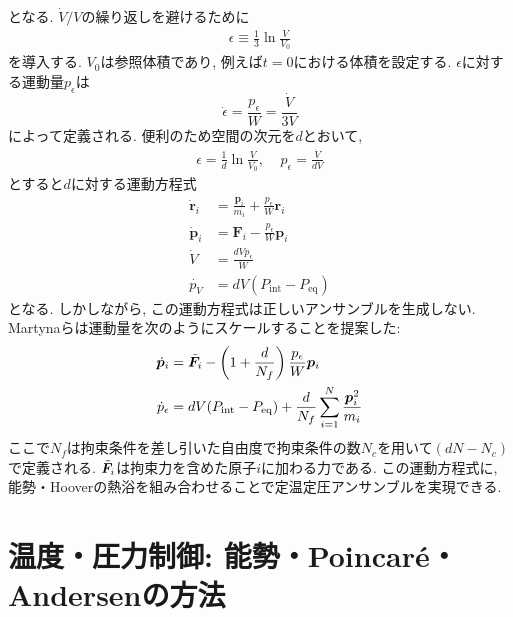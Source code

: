 となる.
$\dot{V}/V$の繰り返しを避けるために
\begin{align}
 \epsilon \equiv \frac{1}{3} \ln \frac{V}{V_{0}}
\end{align}
を導入する.
$V_{0}$は参照体積であり, 例えば$t=0$における体積を設定する.
$\epsilon$に対する運動量$p_{\epsilon}$は
\begin{equation}
 \dot{\epsilon} = \frac{p_{\epsilon}}{W} = \frac{\dot{V}}{3V}
\end{equation}
によって定義される.
便利のため空間の次元を$d$とおいて,
\begin{align}
 \epsilon     = \frac{1}{d} \ln \frac{V}{V_{0}}, ~~~~~
 p_{\epsilon} = \frac{\dot{V}}{dV}
\end{align}
とすると$d$に対する運動方程式
\begin{align}
 \dot{\bm{r}}_{i} &= \frac{\bm{p}_{i}}{m_{i}} + \frac{p_{\epsilon}}{W} \bm{r}_{i} \\
 \dot{\bm{p}}_{i} &= \bm{F}_{i} - \frac{p_{\epsilon}}{W} \bm{p}_{i} \\
 \dot{V}          &= \frac{dV p_{\epsilon}}{W} \\
 \dot{p_{V}}      &= dV (P_{\mathrm{int}} - P_{\mathrm{eq}})
\end{align}
となる.
しかしながら, この運動方程式は正しいアンサンブルを生成しない. 
Martyna\cite{1994Martyna}らは運動量を次のようにスケールすることを提案した:
\begin{align}
  \dot{\bm{p}}_{i}   &= \Tilde{\bm{F}}_{i}
                      - \left(1 + \frac{d}{N_{f}} \right) \frac{p_{\epsilon}}{W} \bm{p}_{i} \\
  \dot{p}_{\epsilon} &= dV (P_{\mathrm{int}} - P_{\mathrm{eq}})
                      + \frac{d}{N_{f}} \sum_{i=1}^{N} \frac{\bm{p}_{i}^{2}}{m_{i}}
\end{align}
ここで$N_{f}$は拘束条件を差し引いた自由度で拘束条件の数$N_{c}$を用いて$(dN - N_{c})$で定義される.
$\Tilde{\bm{F}}_{i}$は拘束力を含めた原子$i$に加わる力である.
この運動方程式に, 能勢・Hooverの熱浴を組み合わせることで定温定圧アンサンブルを実現できる.


\section{温度・圧力制御: 能勢・Poincar\'{e}・Andersenの方法}

